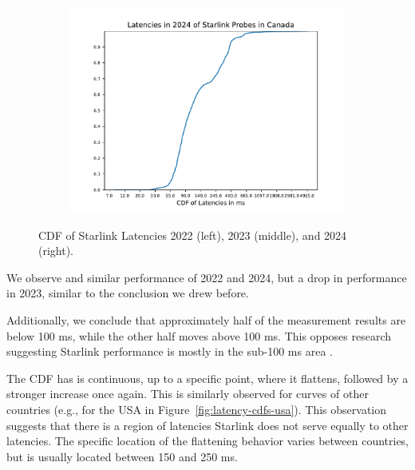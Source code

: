 \begin{figure}
\begin{subfigure}[b]{0.3\linewidth}
		\includegraphics[width=\linewidth]{chapters/4-results/latency/img/cdf_latencies_in_2024_of_starlink_probes_in_canada.pdf}
	\end{subfigure}
	\caption{CDF of Starlink Latencies 2022 (left), 2023 (middle), and 2024 (right).}
	\label{fig:latency-cdfs-canada}
\end{figure}

We observe and similar performance of 2022 and 2024, but a drop in performance
in 2023, similar to the conclusion we drew before.

Additionally, we conclude that approximately half of the measurement results
are below 100 ms, while the other half moves above 100 ms. This opposes
research suggesting Starlink performance is mostly in the sub-100 ms area
\cite{DBLP:conf/www/MohanFCBRMO24, DBLP:conf/icnp/LaiLL20,
	DBLP:journals/pacmnet/RamanVCSZ23, DBLP:conf/imc/MichelTGB22}.

The CDF has is continuous, up to a specific point, where it flattens, followed
by a stronger increase once again. This is similarly observed for curves of
other countries (e.g., for the USA in Figure~\ref{fig:latency-cdfs-usa}). This
observation suggests that there is a region of latencies Starlink does not
serve equally to other latencies. The specific location of the flattening
behavior varies between countries, but is usually located between 150 and 250
ms.

